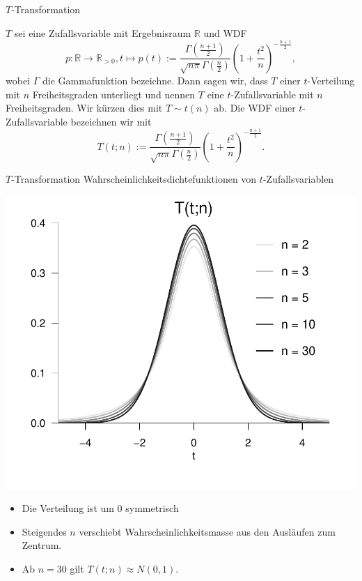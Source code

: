 \documentclass[
  8pt,
  ignorenonframetext,
]{beamer}
\providecommand{\tightlist}{%
  \setlength{\itemsep}{0pt}\setlength{\parskip}{0pt}}
\begin{document}
\begin{frame}{\(T\)-Transformation}
\protect\hypertarget{t-transformation}{}
\small
\begin{definition}[$t$-Zufallsvariable]
\justifying
$T$ sei eine Zufallsvariable mit Ergebnisraum $\mathbb{R}$ und WDF
\begin{equation}
p : \mathbb{R} \to \mathbb{R}_{>0}, t \mapsto p(t)
:= \frac{\Gamma\left(\frac{n+1}{2}\right)}{\sqrt{n\pi}\Gamma\left(\frac{n}{2}\right)}
\left(1 + \frac{t^2}{n} \right)^{-\frac{n+1}{2}},
\end{equation}
wobei $\Gamma$ die Gammafunktion bezeichne. Dann sagen wir, dass $T$ einer
$t$-Verteilung mit $n$ Freiheitsgraden unterliegt und nennen $T$ eine $t$-Zufallsvariable
mit $n$ Freiheitsgraden. Wir kürzen dies mit $T \sim t(n)$ ab. Die WDF einer
$t$-Zufallsvariable bezeichnen wir mit
\begin{equation}
T(t;n) := \frac{\Gamma\left(\frac{n+1}{2}\right)}{\sqrt{n\pi}\Gamma\left(\frac{n}{2}\right)}
\left(1 + \frac{t^2}{n} \right)^{-\frac{n+1}{2}}.
\end{equation}
\end{definition}
\end{frame}

\begin{frame}{\(T\)-Transformation}
\protect\hypertarget{t-transformation-1}{}
Wahrscheinlichkeitsdichtefunktionen von \(t\)-Zufallsvariablen
\vspace{5mm}

\begin{center}\includegraphics[width=0.6\linewidth]{8_Abbildungen/wtfi_8_t_wdf} \end{center}
\vspace{-3mm}
\footnotesize

\begin{itemize}
\tightlist
\item
  Die Verteilung ist um 0 symmetrisch
\item
  Steigendes \(n\) verschiebt Wahrscheinlichkeitsmasse aus den Ausläufen
  zum Zentrum.
\item
  Ab \(n = 30\) gilt \(T(t;n) \approx N(0,1)\).
\end{itemize}
\end{frame}
\end{document}
